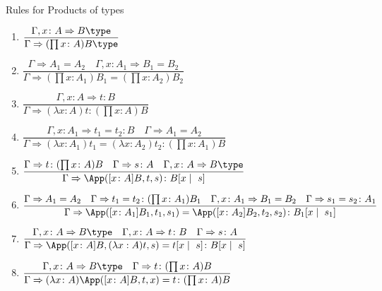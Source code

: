 Rules for Products of types

\begin{enumerate}
    \item[\textsc{$\prod$-Form}] $\dfrac{
        \Gamma, x \colon A \Rightarrow B \type
    }{
        \Gamma 
        \Rightarrow 
        (\prod x \colon A) B \type
    }$
    \item[\textsc{$\prod$-Equ}] $\dfrac{
        \Gamma \Rightarrow A_1 = A_2
        \quad
        \Gamma, x \colon A_1 \Rightarrow B_1 = B_2
    }{
        \Gamma
        \Rightarrow
        (\prod x \colon A_1) B_1
        =
        (\prod x \colon A_2) B_2
    }$
    \item[\textsc{$\prod$-Intro}] $\dfrac{
        \Gamma, x \colon A \Rightarrow t : B
    }{
        \Gamma
        \Rightarrow
        (\lambda x \colon A) t
        :
        (\prod x \colon A) B
    }$
    \item[\textsc{$\xi$-Rule}] $\dfrac{
        \Gamma, x \colon A_1 \Rightarrow t_1 = t_2 : B
        \quad
        \Gamma \Rightarrow A_1 = A_2
    }{
        \Gamma
        \Rightarrow
        (\lambda x \colon A_1) t_1
        =
        (\lambda x \colon A_2) t_2
        \colon
        (\prod x \colon A_1) B
    }$
    \item[\textsc{$\prod$-Elim}] $\dfrac{
        \Gamma \Rightarrow t \colon (\prod x \colon A) B
        \quad
        \Gamma \Rightarrow s \colon A
        \quad
        \Gamma, x \colon A \Rightarrow B \type
    }{
        \Gamma
        \Rightarrow
        \App([x \colon A] B, t, s) 
        \colon 
        B[x \mid\ s]
    }$
    \item[\textsc{$\prod$-Elim-Equ}] $\dfrac{
        \Gamma \Rightarrow A_1 = A_2
        \quad
        \Gamma \Rightarrow t_1 = t_2 \colon (\prod x \colon A_1) B_1
        \quad
        \Gamma, x \colon A_1 \Rightarrow B_1 = B_2
        \quad
        \Gamma \Rightarrow s_1 = s_2 \colon A_1
    }{
        \Gamma
        \Rightarrow
        \App([x \colon A_1] B_1, t_1, s_1)
        = 
        \App([x \colon A_2] B_2, t_2, s_2)
        \colon
        B_1[x \mid\ s_1]
    }$
    \item[\textsc{$\beta$-Rule}] $\dfrac{
        \Gamma, x \colon A \Rightarrow B \type
        \quad
        \Gamma, x \colon A \Rightarrow t \colon B
        \quad
        \Gamma \Rightarrow s \colon A
    }{
        \Gamma 
        \Rightarrow
        \App([x \colon A] B, (\lambda x : A) t, s)
        = 
        t[x \mid\ s] 
        \colon
        B[x \mid\ s]
    }$
    \item[\textsc{$\eta$-rule}] $\dfrac{
        \Gamma, x \colon A \Rightarrow B \type
        \quad
        \Gamma \Rightarrow t \colon (\prod x \colon A) B
    }{
        \Gamma 
        \Rightarrow
        (\lambda x \colon A) \App([x \colon A] B, t, x) 
        = 
        t
        \colon
        (\prod x \colon A) B
    }$
\end{enumerate}

